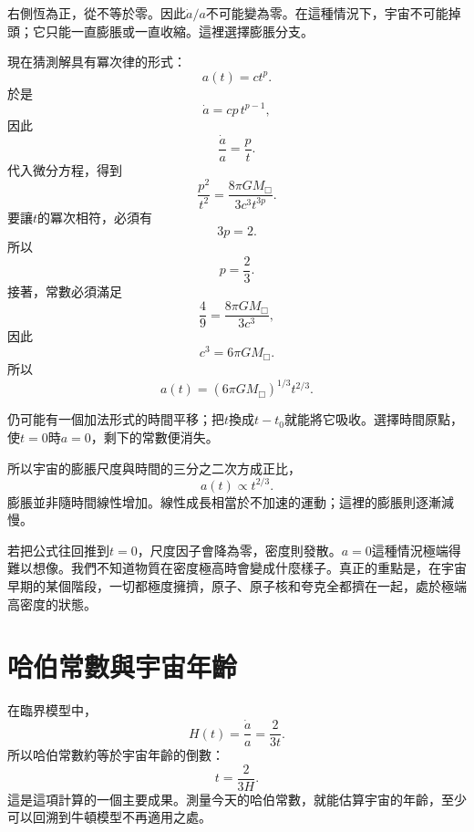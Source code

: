 右側恆為正，從不等於零。因此\(\dot a/a\)不可能變為零。在這種情況下，宇宙不可能掉頭；它只能一直膨脹或一直收縮。這裡選擇膨脹分支。

現在猜測解具有冪次律的形式：
\begin{equation}
a(t)=ct^p.
\end{equation}
於是
\begin{equation}
\dot a = cp\,t^{p-1},
\end{equation}
因此
\begin{equation}
\frac{\dot a}{a}=\frac{p}{t}.
\end{equation}
代入微分方程，得到
\begin{equation}
\frac{p^2}{t^2}=\frac{8\pi G M_{\Box}}{3c^3t^{3p}}.
\end{equation}
要讓\(t\)的冪次相符，必須有
\begin{equation}
3p=2.
\end{equation}
所以
\begin{equation}
p=\frac{2}{3}.
\end{equation}
接著，常數必須滿足
\begin{equation}
\frac{4}{9}=\frac{8\pi G M_{\Box}}{3c^3},
\end{equation}
因此
\begin{equation}
c^3=6\pi G M_{\Box}.
\end{equation}
所以
\begin{equation}
a(t)=\left(6\pi G M_{\Box}\right)^{1/3}t^{2/3}.
\end{equation}

仍可能有一個加法形式的時間平移；把\(t\)換成\(t-t_0\)就能將它吸收。選擇時間原點，使\(t=0\)時\(a=0\)，剩下的常數便消失。

所以宇宙的膨脹尺度與時間的三分之二次方成正比，
\begin{equation}
a(t)\propto t^{2/3}.
\end{equation}
膨脹並非隨時間線性增加。線性成長相當於不加速的運動；這裡的膨脹則逐漸減慢。

若把公式往回推到\(t=0\)，尺度因子會降為零，密度則發散。\(a=0\)這種情況極端得難以想像。我們不知道物質在密度極高時會變成什麼樣子。真正的重點是，在宇宙早期的某個階段，一切都極度擁擠，原子、原子核和夸克全都擠在一起，處於極端高密度的狀態。

\section{哈伯常數與宇宙年齡}

在臨界模型中，
\begin{equation}
H(t)=\frac{\dot a}{a}=\frac{2}{3t}.
\end{equation}
所以哈伯常數約等於宇宙年齡的倒數：
\begin{equation}
t=\frac{2}{3H}.
\end{equation}
這是這項計算的一個主要成果。測量今天的哈伯常數，就能估算宇宙的年齡，至少可以回溯到牛頓模型不再適用之處。

